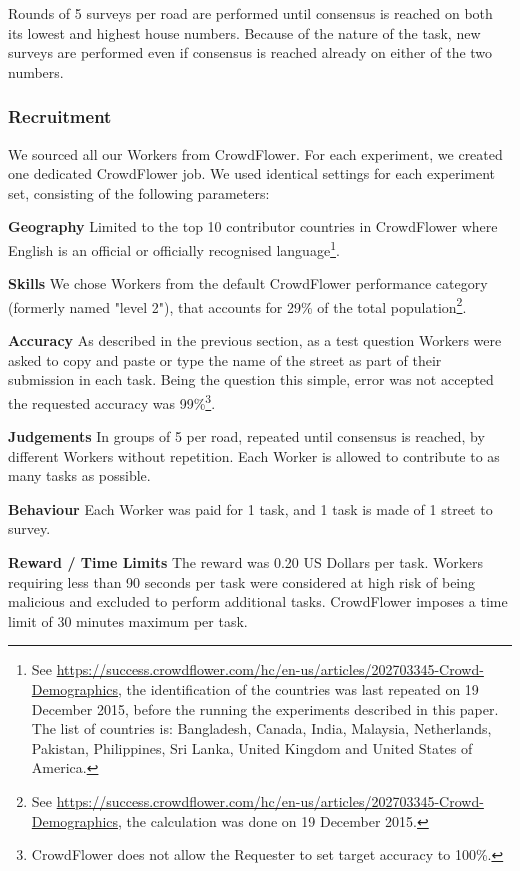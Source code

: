 Rounds of 5 surveys per road are performed until consensus is reached on both its lowest and highest house numbers. Because of the nature of the task, new surveys are performed even if consensus is reached already on either of the two numbers.  

\subsubsection{Recruitment}

We sourced all our Workers from CrowdFlower. For each experiment, we created one dedicated CrowdFlower job. We used identical settings for each experiment set, consisting of the following parameters:

\textbf{Geography} Limited to the top 10 contributor countries in CrowdFlower where English is an official or officially recognised language\footnote{See \url{https://success.crowdflower.com/hc/en-us/articles/202703345-Crowd-Demographics}, the identification of the countries was last repeated on 19 December 2015, before the running the experiments described in this paper. The list of countries is: Bangladesh, Canada, India, Malaysia, Netherlands, Pakistan, Philippines, Sri Lanka, United Kingdom and United States of America.}.

\textbf{Skills} We chose Workers from the default CrowdFlower performance category (formerly named "level 2"), that accounts for 29\% of the total population\footnote{See \url{https://success.crowdflower.com/hc/en-us/articles/202703345-Crowd-Demographics}, the calculation was done on 19 December 2015.}.

\textbf{Accuracy} As described in the previous section, as a test question Workers were asked to copy and paste or type the name of the street as part of their submission in each task. Being the question this simple, error was not accepted the requested accuracy was 99\%\footnote{CrowdFlower does not allow the Requester to set target accuracy to 100\%.}.

\textbf{Judgements} In groups of 5 per road, repeated until consensus is reached, by different Workers without repetition. Each Worker is allowed to contribute to as many tasks as possible.

\textbf{Behaviour} Each Worker was paid for 1 task, and 1 task is made of 1 street to survey.

\textbf{Reward / Time Limits} The reward was 0.20 US Dollars per task. Workers requiring less than 90 seconds per task were considered at high risk of being malicious and excluded to perform additional tasks. CrowdFlower imposes a time limit of 30 minutes maximum per task.

